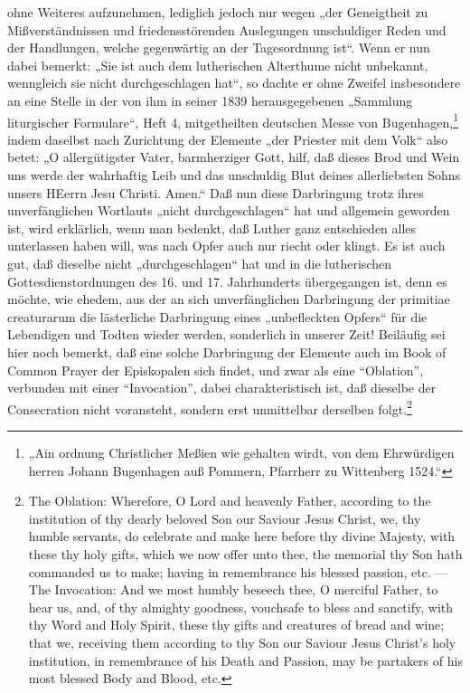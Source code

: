 ohne Weiteres aufzunehmen, lediglich jedoch nur wegen „der Geneigtheit zu Mißverständnissen und friedensstörenden Auslegungen unschuldiger Reden und der Handlungen, welche gegenwärtig an der Tagesordnung ist“. Wenn er nun dabei bemerkt: „Sie ist auch dem lutherischen Alterthume nicht unbekannt, wenngleich sie nicht durchgeschlagen hat“, so dachte er ohne Zweifel insbesondere an eine Stelle in der von ihm in seiner 1839 herausgegebenen „Sammlung liturgischer Formulare“, Heft 4, mitgetheilten deutschen Messe von Bugenhagen,\footnote{„Ain ordnung Christlicher Meßien wie gehalten wirdt, von dem Ehrwürdigen herren Johann Bugenhagen auß Pommern, Pfarrherr zu Wittenberg 1524.“} indem daselbst nach Zurichtung der Elemente „der Priester mit dem Volk“ also betet: „O allergütigster Vater, barmherziger Gott, hilf, daß dieses Brod und Wein uns werde der wahrhaftig Leib und das unschuldig Blut deines allerliebsten Sohns unsers HEerrn Jesu Christi. Amen.“ Daß nun diese Darbringung trotz ihres unverfänglichen Wortlauts „nicht durchgeschlagen“ hat und allgemein geworden ist, wird erklärlich, wenn man bedenkt, daß Luther ganz entschieden alles unterlassen haben will, was nach Opfer auch nur riecht oder klingt. Es ist auch gut, daß dieselbe nicht „durchgeschlagen“ hat und in die lutherischen Gottesdienstordnungen des 16. und 17. Jahrhunderts übergegangen ist, denn es möchte, wie ehedem, aus der an sich unverfänglichen Darbringung der primitiae creaturarum die lästerliche Darbringung eines „unbefleckten Opfers“ für die Lebendigen und Todten wieder werden, sonderlich in unserer Zeit! Beiläufig sei hier noch bemerkt, daß eine solche Darbringung der Elemente auch im Book of Common Prayer der Episkopalen sich findet, und zwar als eine “Oblation”, verbunden mit einer “Invocation”, dabei charakteristisch ist, daß dieselbe der Consecration nicht voransteht, sondern erst unmittelbar derselben folgt.\footnote{The Oblation: Wherefore, O Lord and heavenly Father, according to the institution of thy dearly beloved Son our Saviour Jesus Christ, we, thy humble servants, do celebrate and make here before thy divine Majesty, with these thy holy gifts, which we now offer unto thee, the memorial thy Son hath commanded us to make; having in remembrance his blessed passion, etc. — The Invocation: And we most humbly beseech thee, O merciful Father, to hear us, and, of thy almighty goodness, vouchsafe to bless and sanctify, with thy Word and Holy Spirit, these thy gifts and creatures of bread and wine; that we, receiving them according to thy Son our Saviour Jesus Christ’s holy institution, in remembrance of his Death and Passion, may be partakers of his most blessed Body and Blood, etc.}


